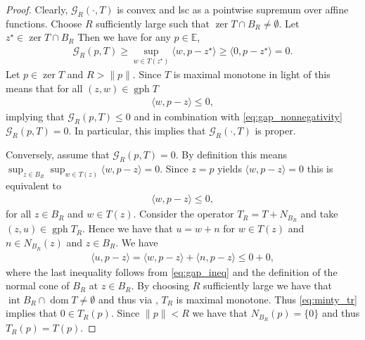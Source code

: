 \documentclass[11pt,onecolumn]{article}
\DeclareMathOperator{\gph}{gph}
\DeclareMathOperator{\dom}{dom}
\DeclareMathOperator{\intr}{int}
\DeclareMathOperator{\zer}{zer}
\theoremstyle{remark}
\begin{document}
\begin{proof}
    Clearly, $\mathcal{G}_R(\cdot, T)$ is convex and lsc as a pointwise supremum over affine functions. Choose $R$ sufficiently large such that $\zer T \cap B_R \neq \emptyset$. Let $z^\star \in \zer T \cap B_R$ Then we have for any $p \in \mathbb{E}$, 
    \begin{align} \label{eq:gap_nonnegativity}
    \mathcal{G}_R(p, T) \geq \sup_{w \in T(z^\star)} \langle w, p - z^\star \rangle \geq \langle 0, p - z^\star \rangle =0.
    \end{align}
    Let $p \in \zer T$ and $R> \|p\|$.
    Since $T$ is maximal monotone in light of \cite[Definition 20.20]{BaCo110} this means that for all $(z,w) \in \gph T$
    \begin{align}
        \langle w, p-z\rangle \leq 0, 
    \end{align}
    implying that $\mathcal{G}_R(p, T) \leq 0$ and in combination with \cref{eq:gap_nonnegativity} $\mathcal{G}_R(p, T)=0$.  In particular, this implies that $\mathcal{G}_R(\cdot, T)$ is proper.

    Conversely, assume that $\mathcal{G}_R(p, T)=0$. By definition this means $\sup_{z \in B_R} \sup_{w \in T(z)} \langle w, p - z\rangle=0$. Since $z=p$ yields $\langle w, p - z\rangle=0$ this is equivalent to
    \begin{align} \label{eq:gap_ineq}
        \langle w, p - z\rangle\leq 0,
    \end{align}
    for all $z \in B_R$ and $w \in T(z)$. Consider the operator $T_R=T+N_{B_R}$ and take $(z,u)\in \gph T_R$. Hence we have that $u = w + n$ for $w \in T(z)$ and $n \in N_{B_R}(z)$ and $z \in B_R$.
    We have
    \begin{align} \label{eq:minty_tr}
        \langle u, p - z\rangle = \langle w, p - z\rangle + \langle n, p - z\rangle \leq 0 + 0,
    \end{align}
    where the last inequality follows from \cref{eq:gap_ineq} and the definition of the normal cone of $B_R$ at $z\in B_R$.
    By choosing $R$ sufficiently large we have that $\intr B_R \cap \dom T \neq \emptyset$ and thus via \cite[Theorem 1]{rockafellar1970maximality}, $T_R$ is maximal monotone. Thus \cref{eq:minty_tr} implies that $0 \in T_R(p)$.
    Since $\|p\| <R$ we have that $N_{B_R}(p)=\{0\}$ and thus $T_R(p)= T(p)$.
\end{proof}
\end{document}
